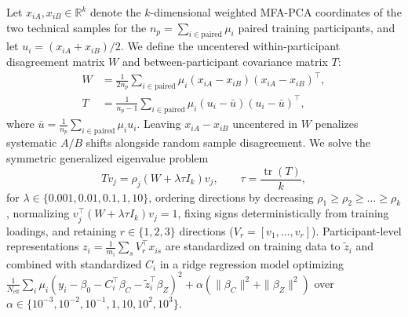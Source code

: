\documentclass[preprint,12pt]{elsarticle}
\begin{document}
Let $x_{iA}, x_{iB} \in \mathbb{R}^k$ denote the $k$-dimensional weighted MFA-PCA coordinates of the two technical samples for the $n_p = \sum_{i \in \text{paired}} \mu_i$ paired training participants, and let $u_i = (x_{iA} + x_{iB})/2$. We define the uncentered within-participant disagreement matrix $W$ and between-participant covariance matrix $T$:
\begin{equation}
\begin{aligned}
W &= \frac{1}{2 n_p} \sum_{i \in \text{paired}} \mu_i (x_{iA} - x_{iB})(x_{iA} - x_{iB})^\top, \\
T &= \frac{1}{n_p - 1} \sum_{i \in \text{paired}} \mu_i (u_i - \bar{u})(u_i - \bar{u})^\top,
\end{aligned}
\label{eq:W_and_T}
\end{equation}
where $\bar{u} = \frac{1}{n_p}\sum_{i \in \text{paired}} \mu_i u_i$. Leaving $x_{iA} - x_{iB}$ uncentered in $W$ penalizes systematic $A/B$ shifts alongside random sample disagreement. We solve the symmetric generalized eigenvalue problem
\begin{equation}
T v_j = \rho_j (W + \lambda \tau I_k) v_j, \qquad \tau = \frac{\operatorname{tr}(T)}{k},
\label{eq:gep}
\end{equation}
for $\lambda \in \{0.001, 0.01, 0.1, 1, 10\}$, ordering directions by decreasing $\rho_1 \ge \rho_2 \ge \dots \ge \rho_k$, normalizing $v_j^\top (W + \lambda \tau I_k) v_j = 1$, fixing signs deterministically from training loadings, and retaining $r \in \{1, 2, 3\}$ directions ($V_r = [v_1, \dots, v_r]$). Participant-level representations $z_i = \frac{1}{m_i}\sum_s V_r^\top x_{is}$ are standardized on training data to $\tilde{z}_i$ and combined with standardized $C_i$ in a ridge regression model optimizing $\frac{1}{N_{\text{eff}}}\sum_i \mu_i (y_i - \beta_0 - C_i^\top \beta_C - \tilde{z}_i^\top \beta_Z)^2 + \alpha (\|\beta_C\|^2 + \|\beta_Z\|^2)$ over $\alpha \in \{10^{-3}, 10^{-2}, 10^{-1}, 1, 10, 10^2, 10^3\}$.
\end{document}

